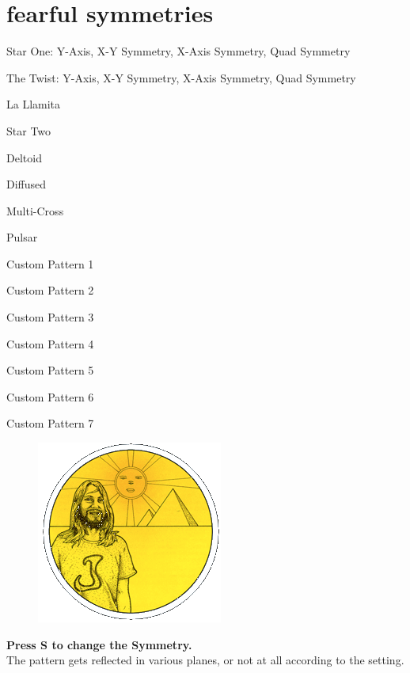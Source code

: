 \chapter{fearful symmetries} 
\label{sec:symmetries}
\rhead[]{\leftmark}
\lstset{style=6502Style}
\lstset{ 
   aboveskip=5pt,
   belowskip=0pt,
}

\newcommand\addItem[2]%
{
  \expandafter\def\csname row:#1\endcsname{#2}%
}

\newcommand\showItem[1]%
{\expandafter\csname row:#1\endcsname}


\newcommand\getItem[1]%
{\noindent
  \text{\showItem{#1}}
  \par
}
\addItem{0}{Star One: Y-Axis, X-Y Symmetry, X-Axis Symmetry, Quad Symmetry}
\addItem{1}{The Twist: Y-Axis, X-Y Symmetry, X-Axis Symmetry, Quad Symmetry}
\addItem{2}{La Llamita}
\addItem{3}{Star Two}
\addItem{4}{Deltoid}
\addItem{5}{Diffused}
\addItem{6}{Multi-Cross}
\addItem{7}{Pulsar}
\addItem{8}{Custom Pattern 1}
\addItem{9}{Custom Pattern 2}
\addItem{10}{Custom Pattern 3}
\addItem{11}{Custom Pattern 4}
\addItem{12}{Custom Pattern 5}
\addItem{13}{Custom Pattern 6}
\addItem{14}{Custom Pattern 7}

\begin{definition}
\setlength{\intextsep}{0pt}%
\setlength{\columnsep}{3pt}%
\begin{figure}
\includegraphics[width=\linewidth]{src/callout/psych.png} 
\end{figure}
\small
\textbf{Press S to change the Symmetry.} \\
  The pattern gets reflected in various planes, or not at all according to the setting.
\\
\\
\end{definition}

